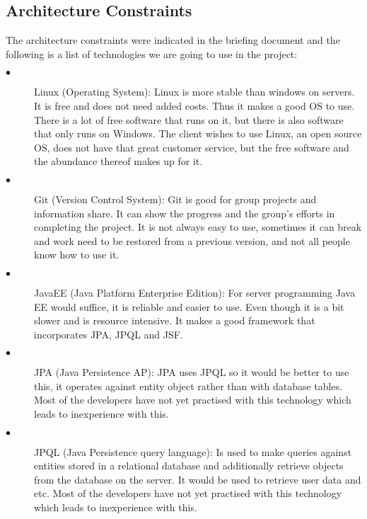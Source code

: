 \documentclass[hidelinks, 12pt]{article}
\begin{document}
\subsection{Architecture Constraints}

The architecture constraints were indicated in the briefing document and the following is a list of technologies we are going to use in the project:

\begin{description}
  \item[$\bullet$] Linux (Operating System):
  Linux is more stable than windows on servers. It is free and does not need added costs. Thus it makes a good OS to use. There is a lot of free software that runs on it, but there is also software that only runs on Windows. The client wishes to use Linux, an open source OS, does not have that great customer service, but the free software and the abundance thereof makes up for it. 
  
  \item[$\bullet$] Git (Version Control System):
  Git is good for group projects and information share. It can show the progress and the group's efforts in completing the project. It is not always easy to use, sometimes it can break and work need to be restored from a previous version, and not all people know how to use it.
  
  \item[$\bullet$] JavaEE (Java Platform Enterprise Edition):
  For server programming Java EE would suffice, it is reliable and easier to use. Even though it is a bit slower and is resource intensive. It makes a good framework that incorporates JPA,  JPQL and JSF.
  
  \item[$\bullet$]JPA (Java Persistence AP):
  JPA uses JPQL so it would be better to use this, it operates against entity object rather than with database tables. Most of the developers have not yet practised with this technology which leads to inexperience with this. 
  
  \item[$\bullet$] JPQL (Java Persistence query language):
  Is used to make queries against entities stored in a relational database and additionally retrieve objects from the database on the server. It would be used to retrieve user data and etc. Most of the developers have not yet practised with this technology which leads to inexperience with this. 
  

\end{description}
\end{document}
